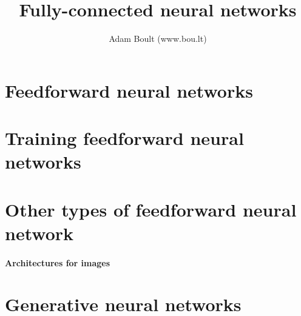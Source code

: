 \documentclass[oneside]{book}
\begin{document}
\author{Adam Boult (www.bou.lt)}
\title{Fully-connected neural networks}
\maketitle

\setcounter{tocdepth}{0}
\tableofcontents



\part{Feedforward neural networks}



\part{Training feedforward neural networks}







\part{Other types of feedforward neural network}


\subsection{Architectures for images}


\part{Generative neural networks}




\end{document}
